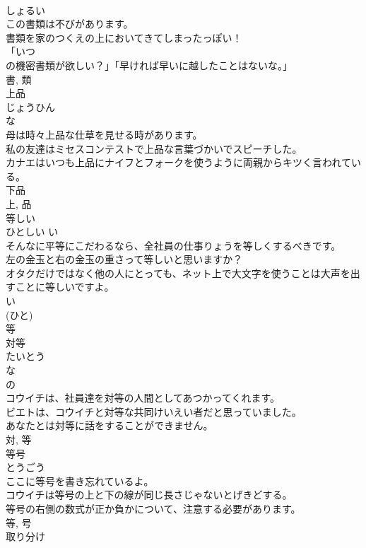 \documentclass[8pt]{extreport}
\begin{document}
\begin{CJK}{UTF8}{min}
\\	しょるい	
\\	この書類は不びがあります。	
\\	書類を家のつくえの上においてきてしまったっぽい！	
\\	「いつ
\\	の機密書類が欲しい？」「早ければ早いに越したことはないな。」	
\\	書, 類	
\\	上品	
\\	じょうひん	
\\	な 
\\	母は時々上品な仕草を見せる時があります。	
\\	私の友達はミセスコンテストで上品な言葉づかいでスピーチした。	
\\	カナエはいつも上品にナイフとフォークを使うように両親からキツく言われている。	
\\	下品 
\\	上, 品	
\\	等しい	
\\	ひとしい	い 
\\	そんなに平等にこだわるなら、全社員の仕事りょうを等しくするべきです。	
\\	左の金玉と右の金玉の重さって等しいと思いますか？	
\\	オタクだけではなく他の人にとっても、ネット上で大文字を使うことは大声を出すことに等しいですよ。	
\\	い 
\\	(ひと) 
\\	等	
\\	対等	
\\	たいとう	
\\	な 
\\	の 
\\	コウイチは、社員達を対等の人間としてあつかってくれます。	
\\	ビエトは、コウイチと対等な共同けいえい者だと思っていました。	
\\	あなたとは対等に話をすることができません。	
\\	対, 等	
\\	等号	
\\	とうごう	
\\	ここに等号を書き忘れているよ。	
\\	コウイチは等号の上と下の線が同じ長さじゃないとげきどする。	
\\	等号の右側の数式が正か負かについて、注意する必要があります。	
\\	等, 号	
\\	取り分け	

\end{CJK}
\end{document}
